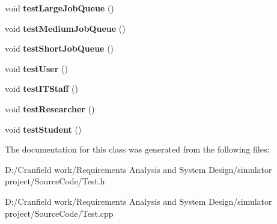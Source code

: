\begin{DoxyCompactItemize}
\mbox{\label{class_test_a139b768530114e54813d672dd0b88388}} 
void {\bfseries test\+Large\+Job\+Queue} ()
\item 
\mbox{\label{class_test_a8e49cb775161256e71bda76826cc3208}} 
void {\bfseries test\+Medium\+Job\+Queue} ()
\item 
\mbox{\label{class_test_abc29314e9cf9979de46392407b891220}} 
void {\bfseries test\+Short\+Job\+Queue} ()
\item 
\mbox{\label{class_test_a0e61f8c2dad4fdf5d60dd98a42c9f2a9}} 
void {\bfseries test\+User} ()
\item 
\mbox{\label{class_test_a596b84b3a78ae1ed51f307c6641b3a3a}} 
void {\bfseries test\+I\+T\+Staff} ()
\item 
\mbox{\label{class_test_a072c839b417675b9f34d4011e7d54147}} 
void {\bfseries test\+Researcher} ()
\item 
\mbox{\label{class_test_a44ed9c72e9610a1d492533445db23a5b}} 
void {\bfseries test\+Student} ()
\end{DoxyCompactItemize}


The documentation for this class was generated from the following files\+:\begin{DoxyCompactItemize}
\item 
D\+:/\+Cranfield work/\+Requirements Analysis and System Design/simulator project/\+Source\+Code/Test.\+h\item 
D\+:/\+Cranfield work/\+Requirements Analysis and System Design/simulator project/\+Source\+Code/Test.\+cpp\end{DoxyCompactItemize}
